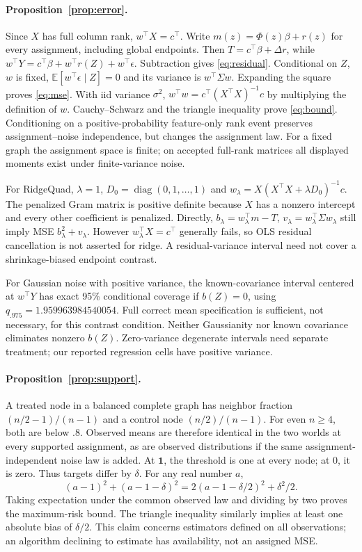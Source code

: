 \documentclass{article}
\newcommand{\E}{\mathbb E}
\newcommand{\one}{\mathbf 1}
\begin{document}
\paragraph{Proposition~\ref{prop:error}.}
Since $X$ has full column rank, $w^\top X=c^\top$. Write $m(z)=\Phi(z)\beta+r(z)$ for every assignment, including global endpoints. Then $T=c^\top\beta+\Delta r$, while $w^\top Y=c^\top\beta+w^\top r(Z)+w^\top\epsilon$. Subtraction gives \eqref{eq:residual}. Conditional on $Z$, $w$ is fixed, $\E[w^\top\epsilon\mid Z]=0$ and its variance is $w^\top\Sigma w$. Expanding the square proves \eqref{eq:mse}. With iid variance $\sigma^2$, $w^\top w=c^\top(X^\top X)^{-1}c$ by multiplying the definition of $w$. Cauchy--Schwarz and the triangle inequality prove \eqref{eq:bound}. Conditioning on a positive-probability feature-only rank event preserves assignment--noise independence, but changes the assignment law. For a fixed graph the assignment space is finite; on accepted full-rank matrices all displayed moments exist under finite-variance noise.

For RidgeQuad, $\lambda=1$, $D_0=\operatorname{diag}(0,1,\ldots,1)$ and $w_\lambda=X(X^\top X+\lambda D_0)^{-1}c$. The penalized Gram matrix is positive definite because $X$ has a nonzero intercept and every other coefficient is penalized. Directly, $b_\lambda=w_\lambda^\top m-T$, $v_\lambda=w_\lambda^\top\Sigma w_\lambda$ still imply MSE $b_\lambda^2+v_\lambda$. However $w_\lambda^\top X=c^\top$ generally fails, so OLS residual cancellation is not asserted for ridge. A residual-variance interval need not cover a shrinkage-biased endpoint contrast.

For Gaussian noise with positive variance, the known-covariance interval centered at $w^\top Y$ has exact 95\% conditional coverage if $b(Z)=0$, using $q_{.975}=1.959963984540054$. Full correct mean specification is sufficient, not necessary, for this contrast condition. Neither Gaussianity nor known covariance eliminates nonzero $b(Z)$. Zero-variance degenerate intervals need separate treatment; our reported regression cells have positive variance.

\paragraph{Proposition~\ref{prop:support}.}
A treated node in a balanced complete graph has neighbor fraction $(n/2-1)/(n-1)$ and a control node $(n/2)/(n-1)$. For even $n\geq4$, both are below .8. Observed means are therefore identical in the two worlds at every supported assignment, as are observed distributions if the same assignment-independent noise law is added. At $\one$, the threshold is one at every node; at $0$, it is zero. Thus targets differ by $\delta$. For any real number $a$,
\[
(a-1)^2+(a-1-\delta)^2=2(a-1-\delta/2)^2+\delta^2/2.
\]
Taking expectation under the common observed law and dividing by two proves the maximum-risk bound. The triangle inequality similarly implies at least one absolute bias of $\delta/2$. This claim concerns estimators defined on all observations; an algorithm declining to estimate has availability, not an assigned MSE.
\end{document}
